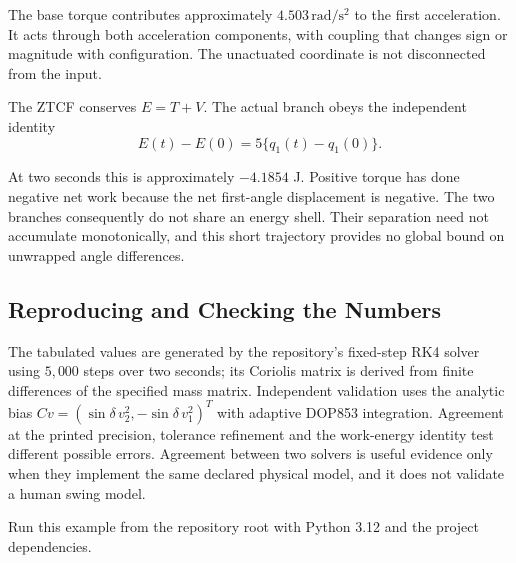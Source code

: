 The base torque contributes approximately $4.503\,\mathrm{rad/s^2}$ to the first acceleration. It acts through both acceleration components, with coupling that changes sign or magnitude with configuration. The unactuated coordinate is not disconnected from the input.

The ZTCF conserves $E=T+V$. The actual branch obeys the independent identity
\begin{equation}
E(t)-E(0)=5\{q_1(t)-q_1(0)\}.
\label{eq:ch7:example-work}
\end{equation}

At two seconds this is approximately $-4.1854$ J. Positive torque has done negative net work because the net first-angle displacement is negative. The two branches consequently do not share an energy shell. Their separation need not accumulate monotonically, and this short trajectory provides no global bound on unwrapped angle differences.

\subsection{Reproducing and Checking the Numbers}
The tabulated values are generated by the repository's fixed-step RK4 solver using $5{,}000$ steps over two seconds; its Coriolis matrix is derived from finite differences of the specified mass matrix. Independent validation uses the analytic bias $C v=(\sin\delta\,v_2^2,-\sin\delta\,v_1^2)^T$ with adaptive DOP853 integration. Agreement at the printed precision, tolerance refinement and the work-energy identity test different possible errors. Agreement between two solvers is useful evidence only when they implement the same declared physical model, and it does not validate a human swing model.

Run this example from the repository root with Python 3.12 and the project dependencies.


